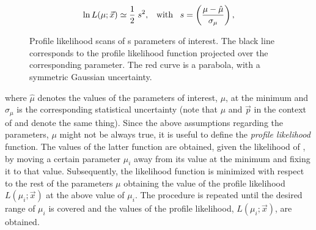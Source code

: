 \begin{equation}
\ln L(\mu;\vec{x}) \simeq \frac{1}{2} \; s^2, \;\;\; \text{with} \;\;\; s = \left( \frac{\mu-\hat{\mu}}{\sigma_{\mu}} \right),
\label{likelihood_exp}
\end{equation}

\begin{figure}[!t]
  \centering
  \begin{subfigure}{0.5\textwidth}
    \raggedright
    \scalebox{0.54}{}
    \caption{}
    \label{nll_ACP0}
  \end{subfigure}%
  \hfill%
  \begin{subfigure}{0.5\textwidth}
    \raggedleft
    \scalebox{0.54}{}
    \caption{}
    \label{nll_ACPperp}
  \end{subfigure}
  \begin{subfigure}{0.5\textwidth}
    \raggedright
    \scalebox{0.54}{}
    \caption{}
    \label{nll_ACPpar}
  \end{subfigure}%
  \hfill%
  \begin{subfigure}{0.5\textwidth}
    \raggedleft
    \scalebox{0.54}{}
    \caption{}
    \label{nll_ACPS}
  \end{subfigure}
\caption{Profile likelihood scans of \Acp{} parameters of interest. The black line corresponds to the profile likelihood
         function projected over the corresponding parameter. The red curve is a parabola, with a symmetric Gaussian
         uncertainty.}
\end{figure}

\noindent where $\hat{\mu}$ denotes the values of the parameters of interest, $\mu$, at the minimum and $\sigma_{\mu}$ is
the corresponding statistical uncertainty (note that $\mu$ and $\vec{p}$ in the context of 
and  denote the same thing). Since the above assumptions regarding the parameters,
$\mu$ might not be always true, it is useful to define the {\it profile likelihood} function.
The values of the latter function are obtained, given the likelihood of , by moving a certain
parameter $\mu_i$ away from its value at the minimum and fixing it to that value. Subsequently, the likelihood
function is minimized with respect to the rest of the parameters $\mu$ obtaining the value of the profile likelihood
$L(\mu_i;\vec{x})$ at the above value of $\mu_i$. The procedure is repeated until the desired range of $\mu_i$
is covered and the values of the profile likelihood, $L(\mu_i;\vec{x})$, are obtained.

